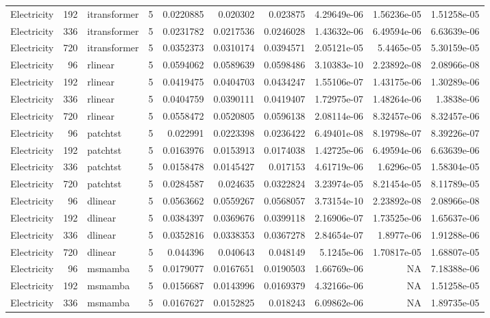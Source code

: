 \begin{longtable}{lrllrrrrrr}
Electricity & 192 & itransformer & 5 & 0.0220885 & 0.020302 & 0.023875 & 4.29649e-06 & 1.56236e-05 & 1.51258e-05 \\
Electricity & 336 & itransformer & 5 & 0.0231782 & 0.0217536 & 0.0246028 & 1.43632e-06 & 6.49594e-06 & 6.63639e-06 \\
Electricity & 720 & itransformer & 5 & 0.0352373 & 0.0310174 & 0.0394571 & 2.05121e-05 & 5.4465e-05 & 5.30159e-05 \\
Electricity & 96 & rlinear & 5 & 0.0594062 & 0.0589639 & 0.0598486 & 3.10383e-10 & 2.23892e-08 & 2.08966e-08 \\
Electricity & 192 & rlinear & 5 & 0.0419475 & 0.0404703 & 0.0434247 & 1.55106e-07 & 1.43175e-06 & 1.30289e-06 \\
Electricity & 336 & rlinear & 5 & 0.0404759 & 0.0390111 & 0.0419407 & 1.72975e-07 & 1.48264e-06 & 1.3838e-06 \\
Electricity & 720 & rlinear & 5 & 0.0558472 & 0.0520805 & 0.0596138 & 2.08114e-06 & 8.32457e-06 & 8.32457e-06 \\
Electricity & 96 & patchtst & 5 & 0.022991 & 0.0223398 & 0.0236422 & 6.49401e-08 & 8.19798e-07 & 8.39226e-07 \\
Electricity & 192 & patchtst & 5 & 0.0163976 & 0.0153913 & 0.0174038 & 1.42725e-06 & 6.49594e-06 & 6.63639e-06 \\
Electricity & 336 & patchtst & 5 & 0.0158478 & 0.0145427 & 0.017153 & 4.61719e-06 & 1.6296e-05 & 1.58304e-05 \\
Electricity & 720 & patchtst & 5 & 0.0284587 & 0.024635 & 0.0322824 & 3.23974e-05 & 8.21454e-05 & 8.11789e-05 \\
Electricity & 96 & dlinear & 5 & 0.0563662 & 0.0559267 & 0.0568057 & 3.73154e-10 & 2.23892e-08 & 2.08966e-08 \\
Electricity & 192 & dlinear & 5 & 0.0384397 & 0.0369676 & 0.0399118 & 2.16906e-07 & 1.73525e-06 & 1.65637e-06 \\
Electricity & 336 & dlinear & 5 & 0.0352816 & 0.0338353 & 0.0367278 & 2.84654e-07 & 1.8977e-06 & 1.91288e-06 \\
Electricity & 720 & dlinear & 5 & 0.044396 & 0.040643 & 0.048149 & 5.1245e-06 & 1.70817e-05 & 1.68807e-05 \\
Electricity & 96 & msmamba & 5 & 0.0179077 & 0.0167651 & 0.0190503 & 1.66769e-06 & NA & 7.18388e-06 \\
Electricity & 192 & msmamba & 5 & 0.0156687 & 0.0143996 & 0.0169379 & 4.32166e-06 & NA & 1.51258e-05 \\
Electricity & 336 & msmamba & 5 & 0.0167627 & 0.0152825 & 0.018243 & 6.09862e-06 & NA & 1.89735e-05 \\

\end{longtable}
